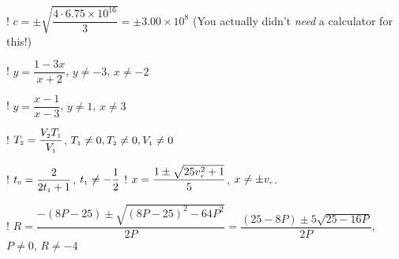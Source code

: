 \begin{tasks}
\task! $c = \pm \sqrt{\dfrac{4 \cdot 6.75 \times 10^{16}}{3}} = \pm 3.00 \times 10^{8}$ (You actually didn't 
\textit{need} a calculator for this!)


\task! $y = \dfrac{1 - 3x}{x+2}$, $y \neq -3$, $x \neq -2$

\task! $y = \dfrac{x-1}{x-3}$, $y \neq 1$, $x \neq 3$

\task! $T_{\text{\tiny $2$}} = \dfrac{V_{\text{\tiny $2$}}T_{\text{\tiny $1$}}}{V_{\text{\tiny $1$}}}$, $T_{\text{\tiny $1$}} \neq 0, T_{\text{\tiny $2$}} \neq 0, V_{\text{\tiny $1$}} \neq 0$


\task!  $t_{\text{\tiny $0$}} = \dfrac{2}{2t_{\text{\tiny $1$}} + 1}$, $t_{\text{\tiny $1$}} \neq -\dfrac{1}{2}$
\task!  $x = \dfrac{1 \pm \sqrt{25v_{\text{\tiny $r$}}^2+1}}{5}$, $x \neq \pm v_{\text{\tiny $r$}}$.

\task! $R= \dfrac{-(8P-25) \pm \sqrt{(8P-25)^2 - 64P^2}}{2P} = \dfrac{(25-8P) \pm 5 \sqrt{25-16P}}{2P}$, $P \neq 0$, $R \neq -4$

\end{tasks}
